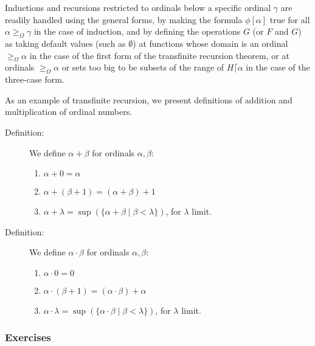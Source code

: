 \documentclass[12pt]{book}
\begin{document}
Inductions and recursions restricted to ordinals below a specific ordinal $\gamma$ are readily handled using the general forms, by making the formula $\phi[\alpha]$ true for all $\alpha\geq_{\Omega} \gamma$ in the case of induction, and by defining the operations $G$ (or $F$ and $G$) as taking default values (such as $\emptyset$) at functions whose domain is an ordinal $\geq_{\Omega} \alpha$ in the case of the first form of the transfinite recursion theorem, or at ordinals $\geq_{\Omega} \alpha$ or sets too big to be subsets of the range of $H \lceil \alpha$  in the case of the three-case form.

As an example of transfinite recursion, we present definitions of addition and multiplication of ordinal numbers.

\begin{description}

\item[Definition:]  We define $\alpha+\beta$ for ordinals $\alpha,\beta$:

\begin{enumerate}

\item  $\alpha+0=\alpha$

\item $\alpha+(\beta+1)=(\alpha+\beta)+1$

\item $\alpha+\lambda = \sup(\{\alpha+\beta\mid \beta<\lambda\})$, for $\lambda$ limit.

\end{enumerate}

\item[Definition:]  We define $\alpha\cdot \beta$ for ordinals $\alpha,\beta$:

\begin{enumerate}

\item  $\alpha\cdot 0=0$

\item $\alpha\cdot (\beta+1)=(\alpha\cdot \beta)+\alpha$

\item $\alpha\cdot \lambda = \sup(\{\alpha\cdot \beta\mid \beta<\lambda\})$, for $\lambda$ limit.


\end{enumerate}

\end{description}

\newpage

\subsubsection{Exercises}
\end{document}
